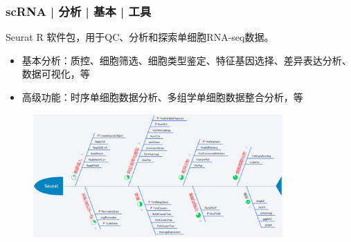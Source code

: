 \documentclass[11pt]{ctexbeamer}
\begin{document}
\begin{frame}
\begin{columns}
\begin{figure}
  \end{figure}
  \end{columns}
\end{frame}

\begin{frame}
  \frametitle{scRNA | 分析 | 基本 | 工具}
  \begin{block}{\alert{Seurat}}
  	\alert{R} 软件包，用于QC、分析和探索单细胞RNA-seq数据。
  	{\small
  	\begin{itemize}
  		\item 基本分析：质控、细胞筛选、细胞类型鉴定、特征基因选择、差异表达分析、数据可视化，等
  		\item 高级功能：时序单细胞数据分析、多组学单细胞数据整合分析，等
  	\end{itemize}
}
  \end{block}
        \begin{figure}
	\includegraphics[width=0.85\textwidth]{scRNA_seurat.png}
\end{figure}
\end{frame}
\end{document}
